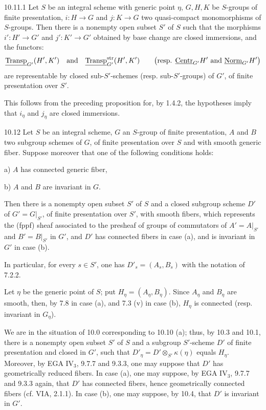 \begin{corollary}{10.11.1}\label{VIB.10.11.1}
Let $S$ be an integral scheme with generic point $\eta$, $G,H,K$ be $S$-groups of finite presentation, $i:H\to G$ and $j:K\to G$ two quasi-compact monomorphisms of $S$-groups. Then there is a nonempty open subset $S'$ of $S$ such that the morphisms $i':H'\to G'$ and $j':K'\to G'$ obtained by base change are closed immersions, and the functors:
\[
\underline{\operatorname{Transp}}_{G'}(H',K')\quad\text{and}\quad\underline{\operatorname{Transp}}^{\mathrm{str}}_{G'}(H',K')
\qquad\bigl(\text{resp. }\underline{\mathrm{Centr}}_{G'}H'\text{ and }\underline{\mathrm{Norm}}_{G'}H'\bigr)
\]
are representable by closed sub-$S'$-schemes (resp. sub-$S'$-groups) of $G'$, of finite presentation over $S'$.
\end{corollary}
This follows from the preceding proposition for, by 1.4.2, the hypotheses imply that $i_\eta$ and $j_\eta$ are closed immersions.

\begin{proposition}{10.12}\label{VIB.10.12}
Let $S$ be an integral scheme, $G$ an $S$-group of finite presentation, $A$ and $B$ two subgroup schemes of $G$, of finite presentation over $S$ and with smooth generic fiber. Suppose moreover that one of the following conditions holds:

a) $A$ has connected generic fiber,

b) $A$ and $B$ are invariant in $G$.

Then there is a nonempty open subset $S'$ of $S$ and a closed subgroup scheme $D'$ of $G'=G|_{S'}$, of finite presentation over $S'$, with smooth fibers, which represents the (fppf) sheaf associated to the presheaf of groups of commutators of $A'=A|_{S'}$ and $B'=B|_{S'}$ in $G'$, and $D'$ has connected fibers in case (a), and is invariant in $G'$ in case (b).

In particular, for every $s\in S'$, one has $D'_s=(A_s,B_s)$ with the notation of 7.2.2.
\end{proposition}
Let $\eta$ be the generic point of $S$; put $H_\eta=(A_\eta,B_\eta)$. Since $A_\eta$ and $B_\eta$ are smooth, then, by 7.8 in case (a), and 7.3 (v) in case (b), $H_\eta$ is connected (resp. invariant in $G_\eta$).

We are in the situation of 10.0 corresponding to 10.10 (a); thus, by 10.3 and 10.1, there is a nonempty open subset $S'$ of $S$ and a subgroup $S'$-scheme $D'$ of finite presentation and closed in $G'$, such that $D'_\eta=D'\otimes_{S'}\kappa(\eta)$ equals $H_\eta$. Moreover, by EGA IV$_3$, 9.7.7 and 9.3.3, one may suppose that $D'$ has geometrically reduced fibers. In case (a), one may suppose, by EGA IV$_3$, 9.7.7 and 9.3.3 again, that $D'$ has connected fibers, hence geometrically connected fibers (cf. VIA, 2.1.1). In case (b), one may suppose, by 10.4, that $D'$ is invariant in $G'$.

